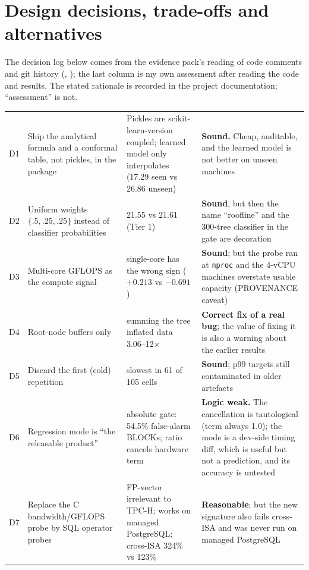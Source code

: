 \chapter{Design decisions, trade-offs and alternatives}\label{ch:decisions}

The decision log below comes from the evidence pack's reading of code comments and git history (\evPACK, ); the last column is my own assessment after reading the code and results. The stated rationale is recorded in the project documentation; ``assessment'' is not.

\begin{center}\small
\begin{longtable}{@{}L{0.7cm}L{3.6cm}L{4.4cm}L{6.0cm}@{}}
\toprule {} &  &  & \\ \midrule \endhead
D1 & Ship the analytical formula and a conformal table, not pickles, in the package & Pickles are scikit-learn-version coupled; learned model only interpolates (17.29 seen vs 26.86 unseen) & \textbf{Sound.} Cheap, auditable, and the learned model is not better on unseen machines\\
D2 & Uniform weights $\{.5,.25,.25\}$ instead of classifier probabilities & 21.55 vs 21.61 (Tier 1) & \textbf{Sound}, but then the name ``roofline'' and the 300-tree classifier in the gate are decoration\\
D3 & Multi-core GFLOPS as the compute signal & single-core has the wrong sign ($+0.213$ vs $-0.691$) & \textbf{Sound}; but the probe ran at \texttt{nproc} and the 4-vCPU machines overstate usable capacity (PROVENANCE caveat)\\
D4 & Root-node buffers only & summing the tree inflated data 3.06--12$\times$ & \textbf{Correct fix of a real bug}; the value of fixing it is also a warning about the earlier results\\
D5 & Discard the first (cold) repetition & slowest in 61 of 105 cells & \textbf{Sound}; p99 targets still contaminated in older artefacts\\
D6 & Regression mode is ``the releasable product'' & absolute gate: 54.5\% false-alarm BLOCKs; ratio cancels hardware term & \textbf{Logic weak.} The cancellation is tautological (term always 1.0); the mode is a dev-side timing diff, which is useful but not a prediction, and its accuracy is untested\\
D7 & Replace the C bandwidth/GFLOPS probe by SQL operator probes & FP-vector irrelevant to TPC-H; works on managed PostgreSQL; cross-ISA 324\% vs 123\% & \textbf{Reasonable}; but the new signature also fails cross-ISA and was never run on managed PostgreSQL\\

\end{longtable}
\end{center}

